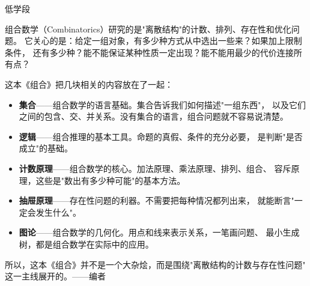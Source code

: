 \documentclass[a4paper,12pt]{ctexart}
\begin{document}
\pagestyle{empty}

\begin{center}
  \large 低学段
\end{center}
\vspace{0.3cm}


组合数学（Combinatorics）研究的是"离散结构"的计数、排列、存在性和优化问题。
它关心的是：给定一组对象，有多少种方式从中选出一些来？如果加上限制条件，
还有多少种？能不能保证某种性质一定出现？能不能用最少的代价连接所有点？

这本《组合》把几块相关的内容放在了一起：
\begin{itemize}
  \item \textbf{集合}——组合数学的语言基础。集合告诉我们如何描述"一组东西"，
  以及它们之间的包含、交、并关系。没有集合的语言，组合问题就不容易说清楚。
  \item \textbf{逻辑}——组合推理的基本工具。命题的真假、条件的充分必要，
  是判断"是否成立"的基础。
  \item \textbf{计数原理}——组合数学的核心。加法原理、乘法原理、排列、组合、
  容斥原理，这些是"数出有多少种可能"的基本方法。
  \item \textbf{抽屉原理}——存在性问题的利器。不需要把每种情况都列出来，
  就能断言"一定会发生什么"。
  \item \textbf{图论}——组合数学的几何化。用点和线来表示关系，一笔画问题、
  最小生成树，都是组合数学在实际中的应用。
\end{itemize}

所以，这本《组合》并不是一个大杂烩，而是围绕"离散结构的计数与存在性问题"
这一主线展开的。\hfill ——编者

\newpage





\end{document}
